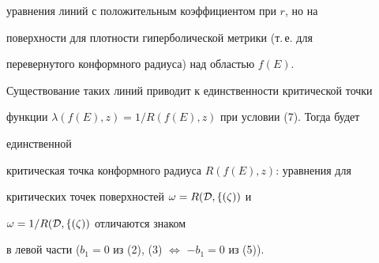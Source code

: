 уравнения линий с положительным коэффициентом при $r$, но на 


поверхности для плотности гиперболической метрики (т.\,е. для 


перевернутого конформного радиуса) над областью $f(E)$. 


Существование таких линий приводит к единственности критической точки 


функции $\lambda(f(E),z)=1/R(f(E),z)$ при условии (7). Тогда будет 


единственной 


критическая точка конформного радиуса $R(f(E),z)$: уравнения для 


критических точек поверхностей $\omega=R(\cal D,f(\zeta))$ и 


$\omega=1/R(\cal D,f(\zeta))$ отличаются знаком 


в левой части ($b_1=0$ из (2), (3) $\Leftrightarrow$ $-b_1=0$ из (5)). 


 



